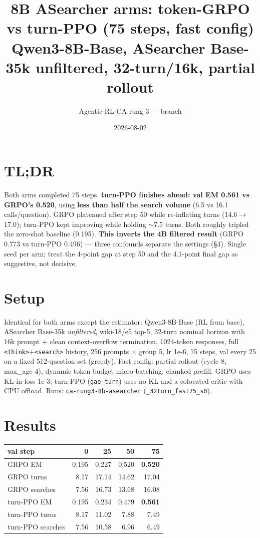 \documentclass[10pt]{article}
\title{\vspace{-1.4em}8B ASearcher arms: token-GRPO vs turn-PPO (75 steps, fast config)\\
\large Qwen3-8B-Base, ASearcher Base-35k unfiltered, 32-turn/16k, partial rollout\vspace{-0.5em}}
\author{Agentic-RL-CA rung-3 --- branch \code{sync-partial-rollout-poc}}
\date{2026-08-02}
\newcommand{\code}[1]{\texttt{\small #1}}
\begin{document}
\maketitle\vspace{-1.8em}

\section*{TL;DR}
Both arms completed 75 steps. \textbf{turn-PPO finishes ahead: val EM 0.561 vs GRPO's
0.520}, using \textbf{less than half the search volume} (6.5 vs 16.1 calls/question).
GRPO plateaued after step 50 while re-inflating turns (14.6$\to$17.0); turn-PPO kept
improving while holding $\sim$7.5 turns. Both roughly tripled the zero-shot baseline
(0.195). \textbf{This inverts the 4B filtered result} (GRPO 0.773 vs turn-PPO 0.496) ---
three confounds separate the settings (\S4). Single seed per arm; treat the 4-point gap at
step 50 and the 4.1-point final gap as suggestive, not decisive.

\section{Setup}
Identical for both arms except the estimator: Qwen3-8B-Base (RL from base), ASearcher
Base-35k \emph{unfiltered}, wiki-18/e5 top-5, 32-turn nominal horizon with 16k prompt +
clean context-overflow termination, 1024-token responses, full \code{<think>}+\code{<search>}
history, 256 prompts $\times$ group 5, lr 1e-6, 75 steps, val every 25 on a fixed
512-question set (greedy). Fast config: partial rollout (cycle 8, max\_age 4), dynamic
token-budget micro-batching, chunked prefill. GRPO uses KL-in-loss 1e-3; turn-PPO
(\code{gae\_turn}) uses no KL and a colocated critic with CPU offload.
Runs: \href{https://wandb.ai/rainyfields/ca-rung3-8b-asearcher}{\code{ca-rung3-8b-asearcher}}
(\code{*\_32turn\_fast75\_s0}).

\section{Results}
\begin{center}
\begin{tabular}{lrrrr}
\toprule
val step & 0 & 25 & 50 & \textbf{75}\\
\midrule
GRPO EM & 0.195 & 0.227 & 0.520 & \textbf{0.520}\\
GRPO turns & 8.17 & 17.14 & 14.62 & 17.04\\
GRPO searches & 7.56 & 16.73 & 13.68 & 16.08\\
\midrule
turn-PPO EM & 0.195 & 0.234 & 0.479 & \textbf{0.561}\\
turn-PPO turns & 8.17 & 11.02 & 7.88 & 7.49\\
turn-PPO searches & 7.56 & 10.58 & 6.96 & 6.49\\
\bottomrule
\end{tabular}
\end{center}
\end{document}
